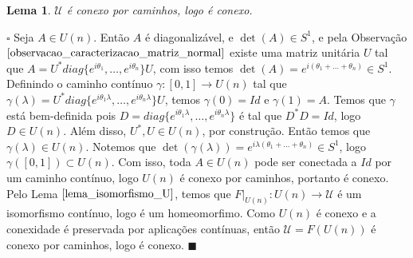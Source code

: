 \documentclass[12pt]{book}
\newtheorem{lema}[teorema]{Lema}
\newenvironment{prova}[1]{$\square$ #1}{\hfill$\blacksquare$}
\newcommand{\circulo}{S^{1}}
\newcommand{\matrizSimpleticaOrtogonal}{\mathcal{U}}
\newcommand{\matrizunitaria}[1]{U(#1)}
\begin{document}
	
	\begin{lema}\label{lema_conexidade_matriz_unitaria}
		$\matrizSimpleticaOrtogonal$ é conexo por caminhos, logo é conexo.
	\end{lema}
	\begin{prova}
		Seja $A \in \matrizunitaria{n}$. Então $A$ é diagonalizável, e $\det(A) \in S^{1}$, e pela Observação $\ref{observacao_caracterizacao_matriz_normal}$ existe uma matriz unitária $U$ tal que $A=U^{*}diag\{e^{i\theta_{1}}, \dots, e^{i\theta_{n}}\}U$, com isso temos $\det(A) = e^{i(\theta_{1}+\dots+\theta_{n})} \in \circulo$. Definindo o caminho contínuo $\gamma:[0,1] \to \matrizunitaria{n}$ tal que $\gamma(\lambda)=U^{*}diag\{e^{i\theta_{1}\lambda}, \dots, e^{i\theta_{n}\lambda}\}U$, temos $\gamma(0)=Id$ e $\gamma(1)=A$. Temos que $\gamma$ está bem-definida pois $D=diag\{e^{i\theta_{1}\lambda}, \dots, e^{i\theta_{n}\lambda}\}$ é tal que $D^{*}D = Id$, logo $D \in \matrizunitaria{n}$. Além disso, $U^{*}, U \in \matrizunitaria{n}$, por construção. Então temos que $\gamma(\lambda) \in \matrizunitaria{n}$. Notemos que $\det(\gamma(\lambda)) = e^{i\lambda(\theta_{1}+\dots+\theta_{n})} \in \circulo$, logo $\gamma([0,1]) \subset \matrizunitaria{n}$. Com isso, toda $A \in \matrizunitaria{n}$ pode ser conectada a $Id$ por um caminho contínuo, logo $\matrizunitaria{n}$ é conexo por caminhos, portanto é conexo. Pelo Lema $\ref{lema_isomorfismo_U}$, temos que $F|_{\matrizunitaria{n}}:\matrizunitaria{n} \to \matrizSimpleticaOrtogonal$ é um isomorfismo contínuo, logo é um homeomorfimo. Como $\matrizunitaria{n}$ é conexo e a conexidade é preservada por aplicações contínuas, então $\matrizSimpleticaOrtogonal = F(\matrizunitaria{n})$ é conexo por caminhos, logo é conexo.
	\end{prova}
	
\end{document}

